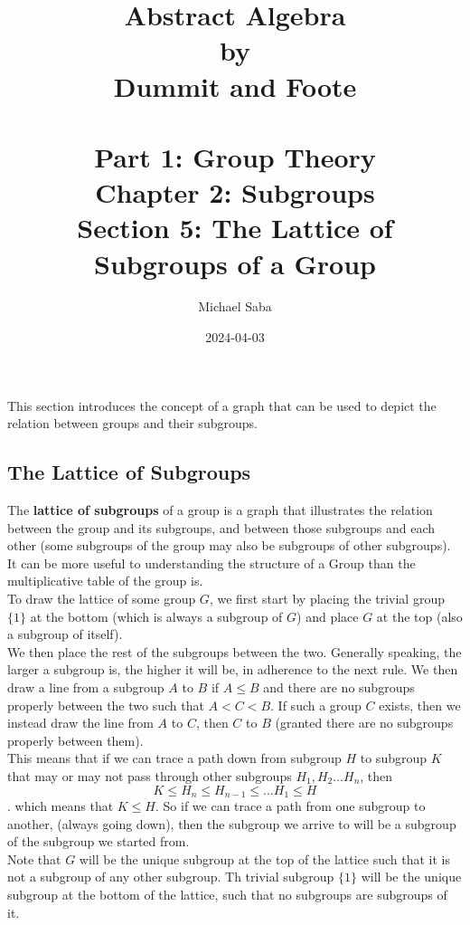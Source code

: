 \documentclass[12pt]{article}
\title{%
    \Huge Abstract Algebra \\
    \large by \\
    \Large Dummit and Foote \\~\\
    \huge Part 1: Group Theory \\
    \LARGE Chapter 2: Subgroups \\
    \Large Section 5: The Lattice of Subgroups of a Group
}
\date{2024-04-03}
\author{Michael Saba}
\begin{document}
    \maketitle
    \newpage
    \setlength{\parindent}{0pt}
    
    This section introduces the concept of a graph 
    that can be used to depict the relation between groups
    and their subgroups. \\

    \subsection*{The Lattice of Subgroups}

    The \textbf{lattice of subgroups} of a group
    is a graph that illustrates the relation between
    the group and its subgroups,
    and between those subgroups and each other
    (some subgroups of the group may also be
    subgroups of other subgroups). \\
    It can be more useful to understanding the structure of a Group
    than the multiplicative table of the group is. \\
    To draw the lattice of some group $G$,
    we first start by placing the trivial group $\{1\}$
    at the bottom
    (which is always a subgroup of $G$)
    and place $G$ at the top
    (also a subgroup of itself). \\
    We then place the rest of the subgroups
    between the two.
    Generally speaking, the larger a subgroup is,
    the higher it will be, in adherence to the next rule.
    We then draw a line from a subgroup $A$ to $B$
    if $A \leqslant B$ and there are no subgroups
    properly between the two such that $A < C < B$.
    If such a group $C$ exists,
    then we instead draw the line from $A$ to $C$,
    then $C$ to $B$
    (granted there are no subgroups properly between them). \\
    This means that if we can trace a path down from subgroup $H$
    to subgroup $K$ that may or may not pass through
    other subgroups $H_1, H_2 \dots H_n$,
    then
    \[ K \leqslant H_n \leqslant H_{n-1} \leqslant \dots H_1 \leqslant H \].
    which means that $K \leqslant H$.
    So if we can trace a path from one subgroup to another,
    (always going down),
    then the subgroup we arrive to will be a subgroup
    of the subgroup we started from. \\
    Note that $G$ will be the unique subgroup at the top of the lattice
    such that it is not a subgroup of any other subgroup.
    Th trivial subgroup $\{1\}$ will be the unique
    subgroup at the bottom of the lattice,
    such that no subgroups are subgroups of it. \\
    
\end{document}
